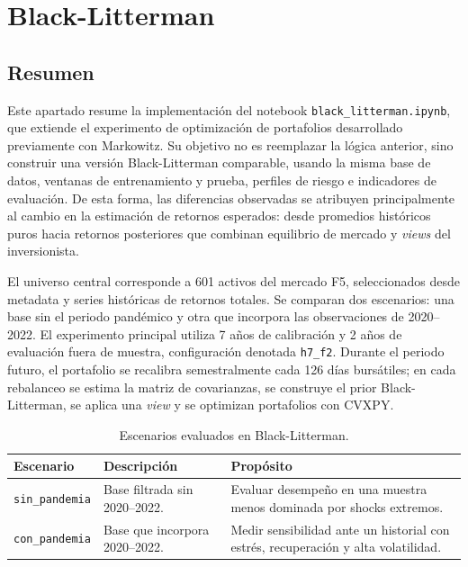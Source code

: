 \clearpage

\section*{Black-Litterman}

\subsection*{Resumen}

Este apartado resume la implementaci\'on del notebook
\texttt{black\_litterman.ipynb}, que extiende el experimento de optimizaci\'on de
portafolios desarrollado previamente con Markowitz. Su objetivo no es reemplazar
la l\'ogica anterior, sino construir una versi\'on Black-Litterman comparable,
usando la misma base de datos, ventanas de entrenamiento y prueba, perfiles de
riesgo e indicadores de evaluaci\'on. De esta forma, las diferencias observadas
se atribuyen principalmente al cambio en la estimaci\'on de retornos esperados:
desde promedios hist\'oricos puros hacia retornos posteriores que combinan
equilibrio de mercado y \textit{views} del inversionista.

El universo central corresponde a 601 activos del mercado F5, seleccionados
desde metadata y series hist\'oricas de retornos totales. Se comparan dos
escenarios: una base sin el periodo pand\'emico y otra que incorpora las
observaciones de 2020--2022. El experimento principal utiliza 7 a\~nos de
calibraci\'on y 2 a\~nos de evaluaci\'on fuera de muestra, configuraci\'on denotada
\texttt{h7\_f2}. Durante el periodo futuro, el portafolio se recalibra
semestralmente cada 126 d\'ias burs\'atiles; en cada rebalanceo se estima la matriz
de covarianzas, se construye el prior Black-Litterman, se aplica una
\textit{view} y se optimizan portafolios con CVXPY.

\begin{table}[H]
\centering
\caption{Escenarios evaluados en Black-Litterman.}
\label{tab:anexo4_bl_escenarios}
\small
\begin{tabular}{@{}p{}p{}p{}@{}}
\toprule
Escenario & Descripci\'on & Prop\'osito \\
\midrule
\texttt{sin\_pandemia} & Base filtrada sin 2020--2022. & Evaluar desempe\~no en una muestra menos dominada por shocks extremos. \\
\texttt{con\_pandemia} & Base que incorpora 2020--2022. & Medir sensibilidad ante un historial con estr\'es, recuperaci\'on y alta volatilidad. \\
\bottomrule
\end{tabular}
\end{table}

